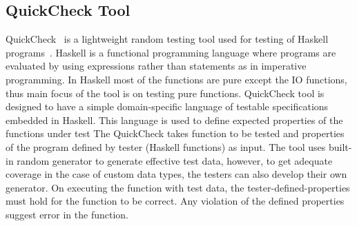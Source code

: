 \subsection{QuickCheck Tool}
QuickCheck~\cite{Claessen2000} is a lightweight random testing tool used for testing of Haskell programs~\cite{Hudak2007}. Haskell is a functional programming language where programs are evaluated by using expressions rather than statements as in imperative programming. In Haskell most of the functions are pure except the IO functions, thus main focus of the tool is on testing pure functions. QuickCheck tool is designed to have a simple domain-specific language of testable specifications embedded in Haskell. This language is used to define expected properties of the functions under test %
\indent The QuickCheck takes function to be tested and properties of the program defined by tester (Haskell functions) as input. The tool uses built-in random generator to generate effective test data, however, to get adequate coverage in the case of custom data types, the testers can also develop their own generator. On executing the function with test data, the tester-defined-properties must hold for the function to be correct. Any violation of the defined properties suggest error in the function.







